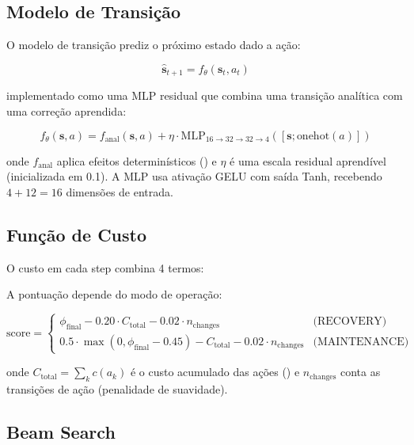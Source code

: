 \subsection{Modelo de Transi\c{c}\~ao}

O modelo de transi\c{c}\~ao prediz o pr\'oximo estado dado a a\c{c}\~ao:

\begin{equation}
    \hat{\bm{s}}_{t+1} = f_\theta(\bm{s}_t, a_t)
\end{equation}

implementado como uma MLP residual que combina uma transi\c{c}\~ao
anal\'itica com uma corre\c{c}\~ao aprendida:

\begin{equation}
    f_\theta(\bm{s}, a) = f_{\text{anal}}(\bm{s}, a) + \eta \cdot \text{MLP}_{16 \to 32 \to 32 \to 4}([\bm{s}; \text{onehot}(a)])
\end{equation}

onde $f_{\text{anal}}$ aplica efeitos determin\'isticos
() e $\eta$ \'e uma escala residual aprend\'ivel
(inicializada em 0.1). A MLP usa ativa\c{c}\~ao GELU com sa\'ida Tanh,
recebendo $4 + 12 = 16$ dimens\~oes de entrada.

\subsection{Fun\c{c}\~ao de Custo}

O custo em cada step combina 4 termos:

A pontua\c{c}\~ao depende do modo de opera\c{c}\~ao:

\begin{equation}
    \text{score} = \begin{cases}
        \phi_{\text{final}} - 0.20 \cdot C_{\text{total}} - 0.02 \cdot n_{\text{changes}} & \text{(RECOVERY)} \\
        0.5 \cdot \max(0, \phi_{\text{final}} - 0.45) - C_{\text{total}} - 0.02 \cdot n_{\text{changes}} & \text{(MAINTENANCE)}
    \end{cases}
    \label{eq:mpc_cost}
\end{equation}

onde $C_{\text{total}} = \sum_k c(a_k)$ \'e o custo acumulado das a\c{c}\~oes
() e $n_{\text{changes}}$ conta as transi\c{c}\~oes
de a\c{c}\~ao (penalidade de suavidade).

\subsection{Beam Search}

